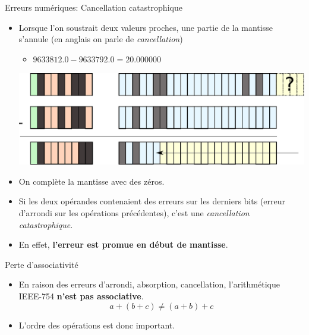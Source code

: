 \documentclass{beamer}
\begin{document}
\begin{frame}{Erreurs numériques: Cancellation catastrophique}
    \begin{itemize}
        \item Lorsque l'on soustrait deux valeurs proches, une partie de la mantisse s'annule (en anglais on parle de \emph{cancellation})
              \begin{itemize}
                  \item $9633812.0 - 9633792.0 = 20.000000$
              \end{itemize}
              \vspace{.25cm}
              \includegraphics[width=.8\textwidth]{cancellation_example}
              \vspace{.25cm}
        \item On complète la mantisse avec des zéros.
        \item Si les deux opérandes contenaient des erreurs sur les derniers bits (erreur d'arrondi sur les opérations précédentes), c'est une \emph{cancellation catastrophique}.
        \item En effet, \textbf{l'erreur est promue en début de mantisse}.
    \end{itemize}
\end{frame}

\begin{frame}{Perte d'associativité}
    \begin{itemize}
        \item En raison des erreurs d'arrondi, absorption, cancellation, l'arithmétique IEEE-754 \textbf{n'est pas associative}.
              \[ a + (b + c) \ne (a + b) +c \]
        \item L'ordre des opérations est donc important.
    \end{itemize}
\end{frame}
\end{document}

